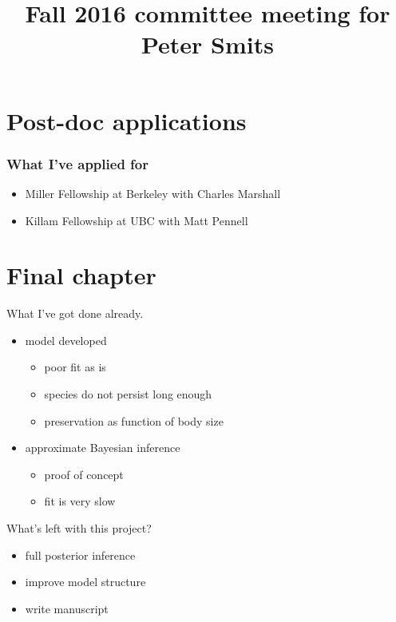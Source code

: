 \documentclass{beamer}
\title{Fall 2016 committee meeting for Peter Smits}
\author{}
\institute{}
\date{}
\begin{document}
\begin{frame}
  \maketitle
\end{frame}

\begin{frame}
  \tableofcontents
\end{frame}

\section{Post-doc applications}
\begin{frame}
  \frametitle{What I've applied for}
  \begin{itemize}
    \item Miller Fellowship at Berkeley with Charles Marshall
    \item Killam Fellowship at UBC with Matt Pennell
  \end{itemize}
\end{frame}


\section{Final chapter}
\begin{frame}
  \begin{block}{What I've got done already.}
    \begin{itemize}
      \item model developed
        \begin{itemize}
          \item poor fit as is
          \item species do not persist long enough
          \item preservation as function of body size
        \end{itemize}
      \item approximate Bayesian inference
        \begin{itemize}
          \item proof of concept
          \item fit is very slow
        \end{itemize}
    \end{itemize}
  \end{block}
\end{frame}

\begin{frame}
  \begin{block}{What's left with this project?}
    \begin{itemize}
      \item full posterior inference
      \item improve model structure
      \item write manuscript
    \end{itemize}
  \end{block}
\end{frame}
\end{document}

